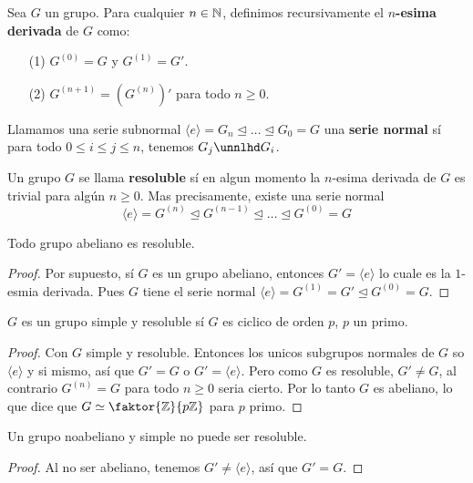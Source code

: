 \begin{definition}
    Sea $G$ un grupo. Para cualquier $n \in \mathbb{N}$, definimos recursivamente el
    \textbf{$n$-esima derivada} de $G$ como:
    \begin{enumerate}
        \item[(1)] $G^{(0)}=G$ y $G^{(1)}=G'$.

        \item[(2)] $G^{(n+1)}=(G^{(n)})'$ para todo $n \geq 0$.
    \end{enumerate}
\end{definition}

\begin{definition}
    Llamamos una serie subnormal $\langle e \rangle=G_n \unlhd \dots \unlhd
    G_0=G$ una \textbf{serie normal} s\'i para todo $0 \leq i \leq j \leq n$,
    tenemos $G_j \unnlhd G_i$.
\end{definition}

\begin{definition}
    Un grupo $G$ se llama \textbf{resoluble} s\'i en algun momento la $n$-esima
    derivada de $G$ es trivial para alg\'un $n \geq 0$. Mas precisamente,
    existe una serie normal
    \begin{equation*}
        \langle e \rangle=G^{(n)} \unlhd G^ {(n-1)} \unlhd \dots \unlhd G^{(0)}=G
    \end{equation*}
\end{definition}

\begin{lemma}\label{11.50}
    Todo grupo abeliano es resoluble.
\end{lemma}
\begin{proof}
    Por supuesto, s\'i $G$ es un grupo abeliano, entonces $G'=\langle e \rangle$
    lo cuale es la $1$-esmia derivada. Pues  $G$ tiene el serie normal  $\langle
    e \rangle=G^{(1)}=G' \unlhd G^{(0)}=G$.
\end{proof}
\begin{corollary}
    $G$ es un grupo simple y resoluble s\'i  $G$ es ciclico de orden  $p$,  $p$
    un primo.
\end{corollary}
\begin{proof}
    Con $G$ simple y resoluble. Entonces los unicos subgrupos normales de  $G$
    so  $\langle e \rangle$ y si mismo, as\'i que $G'=G$ o  $G'=\langle e
    \rangle$. Pero como $G$ es resoluble,  $G' \neq G$, al contrario $G^{(n)}=G$
    para todo $n \geq 0$ seria cierto. Por lo tanto $G$ es abeliano, lo que dice
    que  $G \simeq \faktor{\Z}{p\Z}$ para $p$ primo.
\end{proof}
\begin{corollary}
    Un grupo noabeliano y simple no puede ser resoluble.
\end{corollary}
\begin{proof}
    Al no ser abeliano, tenemos $G' \neq \langle e \rangle$, as\'i que $G'=G$.
\end{proof}

